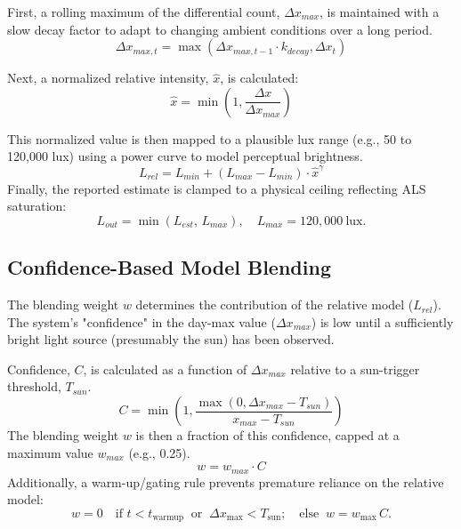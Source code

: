 \documentclass{article}
\begin{document}
First, a rolling maximum of the differential count, $\Delta x_{max}$, is maintained with a slow decay factor to adapt to changing ambient conditions over a long period.
\begin{equation}
    \Delta x_{max, t} = \max(\Delta x_{max, t-1} \cdot k_{decay}, \Delta x_t)
\end{equation}

Next, a normalized relative intensity, $\hat{x}$, is calculated:
\begin{equation}
    \hat{x} = \min\left(1, \frac{\Delta x}{\Delta x_{max}}\right)
\end{equation}

This normalized value is then mapped to a plausible lux range (e.g., 50 to 120,000 lux) using a power curve to model perceptual brightness.
\begin{equation}
    L_{rel} = L_{min} + (L_{max} - L_{min}) \cdot \hat{x}^{\gamma}
\end{equation}
Finally, the reported estimate is clamped to a physical ceiling reflecting ALS saturation:
\begin{equation}
    L_{out} = \min( L_{est},\, L_{max} ),\quad L_{max} = 120{,}000\ \mathrm{lux}.
\end{equation}

\subsection{Confidence-Based Model Blending}
The blending weight $w$ determines the contribution of the relative model ($L_{rel}$). The system's "confidence" in the day-max value ($\Delta x_{max}$) is low until a sufficiently bright light source (presumably the sun) has been observed.

Confidence, $C$, is calculated as a function of $\Delta x_{max}$ relative to a sun-trigger threshold, $T_{sun}$.
\begin{equation}
    C = \min\left(1, \frac{\max(0, \Delta x_{max} - T_{sun})}{x_{max} - T_{sun}}\right)
\end{equation}
The blending weight $w$ is then a fraction of this confidence, capped at a maximum value $w_{max}$ (e.g., 0.25).
\begin{equation}
    w = w_{max} \cdot C
\end{equation}
Additionally, a warm-up/gating rule prevents premature reliance on the relative model:
\begin{equation}
    w = 0 \quad \text{if } t < t_{\text{warmup}}\ \text{ or }\ \Delta x_{\max} < T_{\text{sun}};\quad \text{else }\ w = w_{\max}\,C.
\end{equation}
\end{document}
